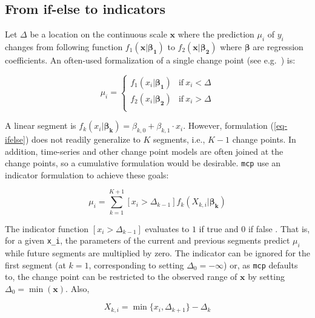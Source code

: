 \documentclass[
  american,
]{article}
\begin{document}
\hypertarget{from-if-else-to-indicators}{%
\subsection{From if-else to indicators}\label{from-if-else-to-indicators}}

Let \(\Delta\) be a location on the continuous scale \(\mathbf{x}\) where the prediction \(\mu_i\) of \(y_i\) changes from following function \(f_1(\mathbf{x}|\mathbf{\beta_1})\) to \(f_2(\mathbf{x|\mathbf{\beta_2}})\) where \(\mathbf{\beta}\) are regression coefficients. An often-used formalization of a single change point (see e.g.~\citep{stephens1994, carlin1992}) is:

\begin{equation}
\label{eq-ifelse}
\mu_i = \begin{cases}
      f_1(x_i | \mathbf{\beta_1}) & \text{if}\ x_i < \Delta \\
      f_2(x_i | \mathbf{\beta_2}) & \text{if}\ x_i > \Delta \\
    \end{cases}
\end{equation}

A linear segment is \(f_k(x_i | \mathbf{\beta_k}) = \beta_{k, 0} + \beta_{k, 1} \cdot x_i\). However, formulation (\ref{eq-ifelse}) does not readily generalize to \(K\) segments, i.e., \(K-1\) change points. In addition, time-series and other change point models are often joined at the change points, so a cumulative formulation would be desirable. \texttt{mcp} use an indicator formulation to achieve these goals:

\begin{equation}
\label{eq-indicator}
\mu_i = \sum_{k=1}^{K+1} [x_i > \Delta_{k-1}]  f_k(X_{k, i} | \mathbf{\beta_k})
\end{equation}

The indicator function \([x_i > \Delta_{k-1}]\) evaluates to \(1\) if true and \(0\) if false \citep{knuth1992}. That is, for a given \texttt{x\_i}, the parameters of the current and previous segments predict \(\mu_i\) while future segments are multiplied by zero. The indicator can be ignored for the first segment (at \(k = 1\), corresponding to setting \(\Delta_0 = -\infty\)) or, as \texttt{mcp} defaults to, the change point can be restricted to the observed range of \(\mathbf{x}\) by setting \(\Delta_0 = \min(\mathbf{x})\). Also,

\begin{equation}
\label{eq-localx}
X_{k,i} = \min\{x_i, \Delta_{k+1}\} - \Delta_{k}
\end{equation}
\end{document}
